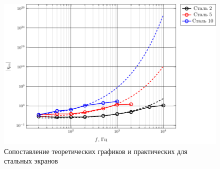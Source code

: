 \documentclass[a4paper,12pt]{article}
\begin{document}
\begin{figure}[H]
	\centering
	\includegraphics[scale=1]{plots/eta_wt_steel}
	\caption{Сопоставление теоретических графиков и практических для стальных экранов}
	\label{fig:eta_wt_steel}
\end{figure}



























 
\end{document}
